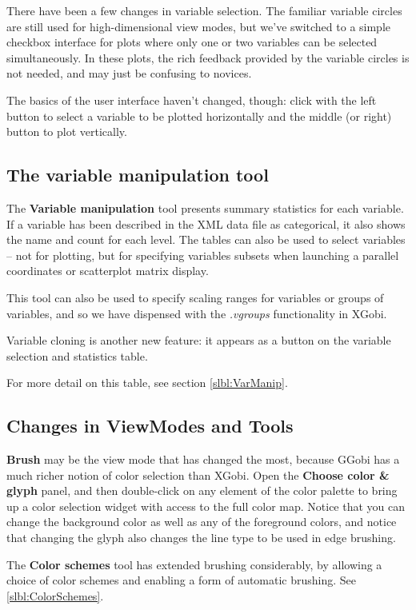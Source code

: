 \documentclass[11pt]{article}
\begin{document}
There have been a few changes in variable selection.  The familiar
variable circles are still used for high-dimensional view modes, but
we've switched to a simple checkbox interface for plots where only one
or two variables can be selected simultaneously.  In these plots, the
rich feedback provided by the variable circles is not needed, and may
just be confusing to novices.

The basics of the user interface haven't changed, though:
click with the left button to select a variable to be plotted
horizontally and the middle (or right) button to plot vertically.

\subsection {The variable manipulation tool}

The {\bf Variable manipulation} tool presents summary statistics for
each variable.  If a variable has been described in the XML data file
as categorical, it also shows the name and count for each level.
The tables can also be used to select variables -- not for plotting, but
for specifying variables subsets when launching a parallel coordinates
or scatterplot matrix display.

This tool can also be used to specify scaling ranges for variables or
groups of variables, and so we have dispensed with the {\em .vgroups}
functionality in XGobi.

Variable cloning is another new feature: it appears as a button
on the variable selection and statistics table.

For more detail on this table, see section \ref{slbl:VarManip}.

\subsection{Changes in ViewModes and Tools}

{\bf Brush} may be the view mode that has changed the most,
because GGobi has a much richer notion of color selection than
XGobi.  Open the {\bf Choose color \& glyph} panel, and then
double-click on any element of the color palette to bring up a color
selection widget with access to the full color map.  Notice that you
can change the background color as well as any of the foreground
colors, and notice that changing the glyph also changes the line
type to be used in edge brushing.

The {\bf Color schemes} tool has extended brushing considerably,
by allowing a choice of color schemes and enabling a form of
automatic brushing.  See \ref{slbl:ColorSchemes}.
\end{document}
